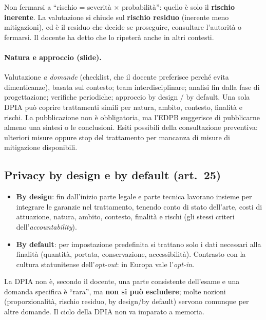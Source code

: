 \begin{esame}
Non fermarsi a ``rischio = severità $\times$ probabilità'': quello è solo il \textbf{rischio
inerente}. La valutazione si chiude sul \textbf{rischio residuo} (inerente meno mitigazioni), ed è il
residuo che decide se proseguire, consultare l'autorità o fermarsi. Il docente ha detto che lo
ripeterà anche in altri contesti.
\end{esame}

\paragraph{Natura e approccio (slide).} Valutazione \emph{a domande} (checklist, che il docente
preferisce perché evita dimenticanze), basata sul contesto; team interdisciplinare; analisi fin dalla
fase di progettazione; verifiche periodiche; approccio by design / by default. Una sola DPIA può
coprire trattamenti simili per natura, ambito, contesto, finalità e rischi. La pubblicazione non è
obbligatoria, ma l'EDPB suggerisce di pubblicarne almeno una sintesi o le conclusioni. Esiti possibili
della consultazione preventiva: ulteriori misure oppure stop del trattamento per mancanza di misure
di mitigazione disponibili.

\subsection{Privacy by design e by default (art.~25)}
\begin{itemize}
  \item \textbf{By design}: fin dall'inizio parte legale e parte tecnica lavorano insieme per
    integrare le garanzie nel trattamento, tenendo conto di stato dell'arte, costi di attuazione,
    natura, ambito, contesto, finalità e rischi (gli stessi criteri dell'\emph{accountability}).
  \item \textbf{By default}: per impostazione predefinita si trattano solo i dati necessari alla
    finalità (quantità, portata, conservazione, accessibilità). Contrasto con la cultura
    statunitense dell'\emph{opt-out}: in Europa vale l'\emph{opt-in}.
\end{itemize}

\begin{esame}
La DPIA non è, secondo il docente, una parte consistente dell'esame e una domanda specifica è
``rara'', ma \textbf{non si può escludere}; molte nozioni (proporzionalità, rischio residuo, by
design/by default) servono comunque per altre domande. Il ciclo della DPIA non va imparato a memoria.
\end{esame}

